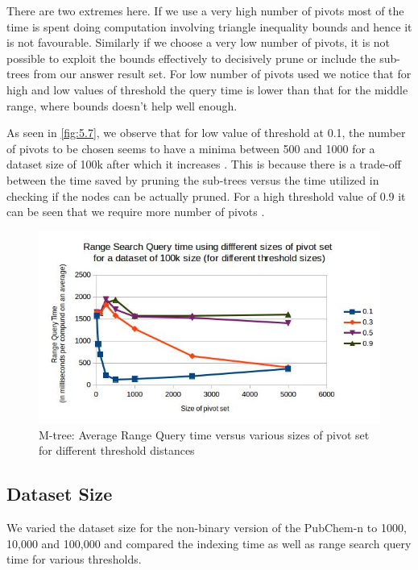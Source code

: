 There are two extremes here. If we use a very high number of pivots most of the time is spent doing computation involving triangle inequality bounds and hence it is not favourable. Similarly if we choose a very low number of pivots, it is not possible to exploit the bounds effectively to decisively prune or include the sub-trees from our answer result set. For low number of pivots used we notice that for high and low values of threshold the query time is lower than that for the middle range, where bounds doesn't help well enough.


As seen in \autoref{fig:5.7}, we observe that for low value of threshold at 0.1, the number of pivots to be chosen seems to have a minima between 500 and 1000 for a dataset size of 100k after which it increases . This is because there is a trade-off between the time saved by pruning the sub-trees versus the time utilized in checking if the nodes can be actually pruned.  For a high threshold value of 0.9 it can be seen that we require more number of pivots . 

\begin{figure}[ht!]	
\centering
\includegraphics[width=1 \columnwidth]{img/image5.jpg}
\caption{M-tree: Average Range Query time versus various sizes of pivot set for different threshold distances}
\label{fig:5.7}
\end{figure}



\subsection{Dataset Size}
We varied the dataset size for the non-binary version of the PubChem-n to 1000, 10,000 and 100,000 and compared the indexing time as well as range search query time for various thresholds. 


